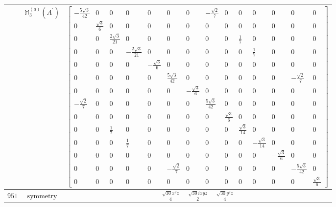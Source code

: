 \documentclass[fleqn,8pt,landscape]{jsarticle}
\begin{document}
\begin{longtable}{ccc}
$  $ & $ \mathbb{M}_{3}^{(a)}(A^{\prime}) $ & $ \begin{bmatrix} - \frac{5 \sqrt{3}}{42} & 0 & 0 & 0 & 0 & 0 & 0 & - \frac{\sqrt{2}}{7} & 0 & 0 & 0 & 0 & 0 & 0 \\ 0 & \frac{\sqrt{3}}{6} & 0 & 0 & 0 & 0 & 0 & 0 & 0 & 0 & 0 & 0 & 0 & 0 \\ 0 & 0 & \frac{2 \sqrt{3}}{21} & 0 & 0 & 0 & 0 & 0 & 0 & \frac{1}{7} & 0 & 0 & 0 & 0 \\ 0 & 0 & 0 & - \frac{2 \sqrt{3}}{21} & 0 & 0 & 0 & 0 & 0 & 0 & \frac{1}{7} & 0 & 0 & 0 \\ 0 & 0 & 0 & 0 & - \frac{\sqrt{3}}{6} & 0 & 0 & 0 & 0 & 0 & 0 & 0 & 0 & 0 \\ 0 & 0 & 0 & 0 & 0 & \frac{5 \sqrt{3}}{42} & 0 & 0 & 0 & 0 & 0 & 0 & - \frac{\sqrt{2}}{7} & 0 \\ 0 & 0 & 0 & 0 & 0 & 0 & - \frac{\sqrt{3}}{6} & 0 & 0 & 0 & 0 & 0 & 0 & 0 \\ - \frac{\sqrt{2}}{7} & 0 & 0 & 0 & 0 & 0 & 0 & \frac{5 \sqrt{3}}{42} & 0 & 0 & 0 & 0 & 0 & 0 \\ 0 & 0 & 0 & 0 & 0 & 0 & 0 & 0 & \frac{\sqrt{3}}{6} & 0 & 0 & 0 & 0 & 0 \\ 0 & 0 & \frac{1}{7} & 0 & 0 & 0 & 0 & 0 & 0 & \frac{\sqrt{3}}{14} & 0 & 0 & 0 & 0 \\ 0 & 0 & 0 & \frac{1}{7} & 0 & 0 & 0 & 0 & 0 & 0 & - \frac{\sqrt{3}}{14} & 0 & 0 & 0 \\ 0 & 0 & 0 & 0 & 0 & 0 & 0 & 0 & 0 & 0 & 0 & - \frac{\sqrt{3}}{6} & 0 & 0 \\ 0 & 0 & 0 & 0 & 0 & - \frac{\sqrt{2}}{7} & 0 & 0 & 0 & 0 & 0 & 0 & - \frac{5 \sqrt{3}}{42} & 0 \\ 0 & 0 & 0 & 0 & 0 & 0 & 0 & 0 & 0 & 0 & 0 & 0 & 0 & \frac{\sqrt{3}}{6} \end{bmatrix} $ \\ \hline
$ 951 $ & $ \text{symmetry} $ & $ \frac{\sqrt{30} x^{2} z}{4} - \frac{\sqrt{30} i x y z}{2} - \frac{\sqrt{30} y^{2} z}{4} $ \\

\end{longtable}
\end{document}
